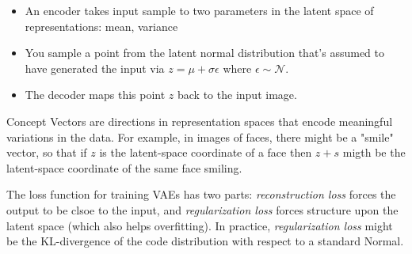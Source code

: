 \begin{itemize}
\item An encoder takes input sample to two parameters in the latent space of representations: mean, variance
\item You sample a point from the latent normal distribution that's assumed to have generated the input via $z = \mu + \sigma \epsilon$ where $\epsilon \sim \mathcal{N}$. 
\item The decoder maps this point $z$ back to the input image. 
\end{itemize} 

\label{Concept Vectors}
Concept Vectors are directions in representation spaces that encode meaningful variations in the data. For example, in images of faces, there might be a "smile" vector, so that if $z$ is the latent-space coordinate of a face then $z+s$ migth be the latent-space coordinate of the same face smiling. 

The loss function for training VAEs has two parts: \textit{reconstruction loss} forces the output to be clsoe to the input, and \textit{regularization loss} forces structure upon the latent space (which also helps overfitting). In practice, \textit{regularization loss} might be the KL-divergence of the code distribution with respect to a standard Normal. 
